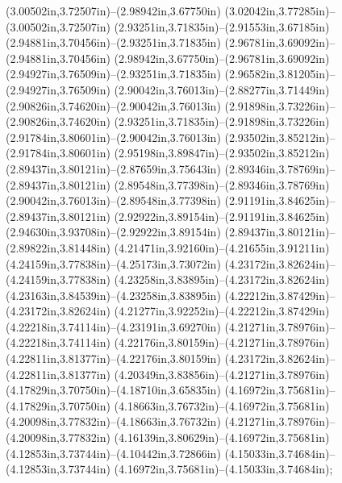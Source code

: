 (3.00502in,3.72507in)--(2.98942in,3.67750in) (3.02042in,3.77285in)--(3.00502in,3.72507in) (2.93251in,3.71835in)--(2.91553in,3.67185in) (2.94881in,3.70456in)--(2.93251in,3.71835in) (2.96781in,3.69092in)--(2.94881in,3.70456in) (2.98942in,3.67750in)--(2.96781in,3.69092in) (2.94927in,3.76509in)--(2.93251in,3.71835in) (2.96582in,3.81205in)--(2.94927in,3.76509in) (2.90042in,3.76013in)--(2.88277in,3.71449in) (2.90826in,3.74620in)--(2.90042in,3.76013in) (2.91898in,3.73226in)--(2.90826in,3.74620in) (2.93251in,3.71835in)--(2.91898in,3.73226in) (2.91784in,3.80601in)--(2.90042in,3.76013in) (2.93502in,3.85212in)--(2.91784in,3.80601in) (2.95198in,3.89847in)--(2.93502in,3.85212in) (2.89437in,3.80121in)--(2.87659in,3.75643in) (2.89346in,3.78769in)--(2.89437in,3.80121in) (2.89548in,3.77398in)--(2.89346in,3.78769in) (2.90042in,3.76013in)--(2.89548in,3.77398in) (2.91191in,3.84625in)--(2.89437in,3.80121in) (2.92922in,3.89154in)--(2.91191in,3.84625in) (2.94630in,3.93708in)--(2.92922in,3.89154in) (2.89437in,3.80121in)--(2.89822in,3.81448in) (4.21471in,3.92160in)--(4.21655in,3.91211in) (4.24159in,3.77838in)--(4.25173in,3.73072in) (4.23172in,3.82624in)--(4.24159in,3.77838in) (4.23258in,3.83895in)--(4.23172in,3.82624in) (4.23163in,3.84539in)--(4.23258in,3.83895in) (4.22212in,3.87429in)--(4.23172in,3.82624in) (4.21277in,3.92252in)--(4.22212in,3.87429in) (4.22218in,3.74114in)--(4.23191in,3.69270in) (4.21271in,3.78976in)--(4.22218in,3.74114in) (4.22176in,3.80159in)--(4.21271in,3.78976in) (4.22811in,3.81377in)--(4.22176in,3.80159in) (4.23172in,3.82624in)--(4.22811in,3.81377in) (4.20349in,3.83856in)--(4.21271in,3.78976in) (4.17829in,3.70750in)--(4.18710in,3.65835in) (4.16972in,3.75681in)--(4.17829in,3.70750in) (4.18663in,3.76732in)--(4.16972in,3.75681in) (4.20098in,3.77832in)--(4.18663in,3.76732in) (4.21271in,3.78976in)--(4.20098in,3.77832in) (4.16139in,3.80629in)--(4.16972in,3.75681in) (4.12853in,3.73744in)--(4.10442in,3.72866in) (4.15033in,3.74684in)--(4.12853in,3.73744in) (4.16972in,3.75681in)--(4.15033in,3.74684in);
